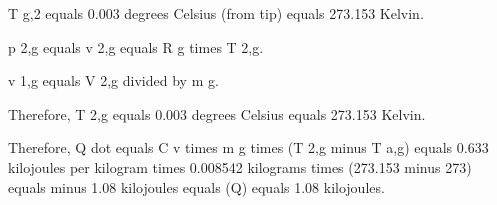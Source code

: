 T g,2 equals 0.003 degrees Celsius (from tip) equals 273.153 Kelvin.

p 2,g equals v 2,g equals R g times T 2,g.

v 1,g equals V 2,g divided by m g.

Therefore, T 2,g equals 0.003 degrees Celsius equals 273.153 Kelvin.

Therefore, Q dot equals C v times m g times (T 2,g minus T a,g) equals 0.633 kilojoules per kilogram times 0.008542 kilograms times (273.153 minus 273) equals minus 1.08 kilojoules equals (Q) equals 1.08 kilojoules.
